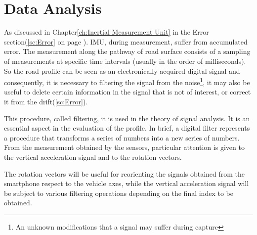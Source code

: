 \documentclass[tesi]{subfiles}
\begin{document}
\chapter{Data Analysis}
\label{ch:Data Analysis}
As discussed in Chapter\ref{ch:Inertial Measurement Unit} in the Error section(\ref{sc:Error} on page \pageref{sc:Error}). IMU, during measurement, suffer from accumulated error. 
The measurement along the pathway of road surface consists of a sampling of measurements at specific time intervals (usually in the order of milliseconds). So the road profile can be seen as an electronically acquired digital signal and consequently, it is necessary to filtering the signal from the noise\footnote{An unknown modifications that a signal may suffer during capture}, it may also be useful to delete certain information in the signal that is not of interest, or correct it from the drift(\ref{sc:Error}).

This procedure, called filtering, it is used in the theory of signal analysis.
It is an essential aspect in the evaluation of the profile\cite{little_book}. In brief, a digital filter represents a procedure that transforms a series of numbers into a new series of numbers\cite{little_book}.
From the measurement obtained by the sensors, particular attention is given to the vertical acceleration signal and to the rotation vectors. 

\clearpage The rotation vectors will be useful for reorienting the signals obtained from the smartphone\cite{Andro} respect to the vehicle axes, while the vertical acceleration signal will be subject to various filtering operations depending on the final index to be obtained.
\end{document}
